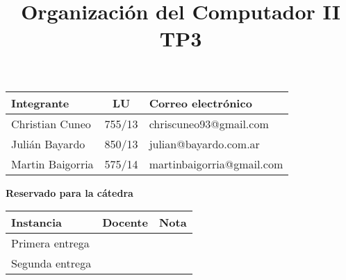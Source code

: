 \documentclass[10pt,a4paper]{article}
\title{Organización del Computador II \\ TP3}
\begin{document}

\maketitle

\bigskip
\normalsize
\begin{table}[h]
\centering
\begin{tabular}{|l l l|}
\hline
Integrante       & \multicolumn{1}{c}{LU}     & Correo electrónico        \\ \hline
Christian Cuneo & \multicolumn{1}{c}{755/13} & chriscuneo93@gmail.com \\ 
Julián Bayardo & 850/13                      & julian@bayardo.com.ar \\
Martin Baigorria & 575/14          & martinbaigorria@gmail.com \\ \hline
\end{tabular}
\end{table}

\vfill

\begin{center}
\textbf{Reservado para la cátedra}
\end{center}
\begin{table}[h]
\centering
\begin{tabular}{|l|l|l|}
\hline
Instancia       & Docente & Nota \\ \hline
Primera entrega &         &      \\ \hline
Segunda entrega &         &      \\ \hline
\end{tabular}
\end{table}

\newpage
\tableofcontents


\pagebreak


\pagebreak


\pagebreak


\pagebreak


\end{document}
